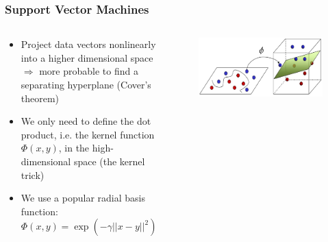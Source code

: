 \documentclass{beamer}
\begin{document}
\frame
{
  \frametitle{Support Vector Machines}

\begin{columns}
\begin{column}{7cm}
{\small
  \begin{itemize}
    \item Project data vectors nonlinearly into a higher dimensional space $\Rightarrow$ more probable to find a separating hyperplane (Cover's theorem)
    \item We only need to define the dot product, i.e. the kernel function $\Phi(x,y)$, in the high-dimensional space (the kernel trick)
    \item We use a popular radial basis function: $\Phi(x,y) = \exp(-\gamma||x-y||^2)$
  \end{itemize}
}
\end{column}
\begin{column}{4.5cm}
\begin{figure}
	\centering
		\includegraphics[width=\textwidth]{svm2.png}
	\label{fig:bridge}
\end{figure}
\end{column}
\end{columns}
}
\end{document}
